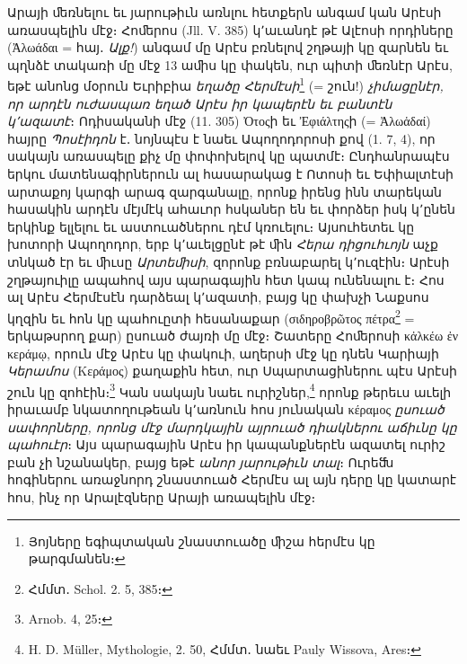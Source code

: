 \documentclass{article}
\begin{document}
{Արայի ﬔռնելու եւ յարութիւն առնլու հետքերն անգամ կան Արէսի առասպելին մէջ։ Հոﬔրոս (Jll. V. 385) կ՚աւանդէ թէ Ալէոսի որդիները (Ἀλωάδαι = հայ․ \emph{Ալք!}) անգամ մը Արէս բռնելով շղթայի կը զարնեն եւ պղնձէ տակառի մը մէջ 13 աﬕս կը փակեն, ուր պիտի ﬔռնէր Արէս, եթէ անոնց մօրուն Եւրիբիա \emph{եղածը Հերմէսի}\footnote{Յոյները եգիպտական շնաստուածը ﬕշա հերմէս կը թարգմանեն։} (= շուն!) \emph{չիմացընէր, որ արդէն ուժասպառ եղած Արէս իր կապերէն եւ բանտէն կ՚ազատէ}։ Ոդիսականի մէջ (11. 305) Ὀτοςի եւ Ἐφιάλτηςի (= Ἀλωἁδαί) հայրը \emph{Պոսէիդոն} է․ նոյնպէս է նաեւ Ապողոդորոսի քով (1. 7, 4), որ սակայն առասպելը քիչ մը փոփոխելով կը պատմէ։ Ընդհանրապէս երկու մատենագիրներուն ալ հասարակաց է Ոտոսի եւ Եփիալտէսի արտաքոյ կարգի արագ զարգանալը, որոնք իրենց ինն տարեկան հասակին արդէն մէյմէկ ահաւոր հսկաներ են եւ փորձեր իսկ կ՚ընեն երկինք ելլելու եւ աստուածներու դէմ կռուելու։ Այսուհետեւ կը խոտորի Ապողոդոր, երբ կ՚աւելցընէ թէ ﬕն \emph{Հերա դիցուհւոյն} աչք տնկած էր եւ ﬕւսը \emph{Արտեﬕսի}, զորոնք բռնաբարել կ՚ուզէին։ Արէսի շղթայուիլը ապահով այս պարագային հետ կապ ունենալու է։ Հոս ալ Արէս Հերմէսէն դարձեալ կ՚ազատի, բայց կը փախչի Նաքսոս կղզին եւ հոն կը պահուըտի հեսանաքար (σιδηροβρῶτος πέτρα\footnote{Հմմտ․ Schol. 2. 5, 385։} = երկաթսրող քար) ըսուած ժայռի մը մէջ։ Շատերը Հոﬔրոսի κἀλκέω ἐν κεράμῳ, որուն մէջ Արէս կը փակուի, աղերսի մէջ կը դնեն Կարիայի \emph{Կերամոս} (Κεράμος) քաղաքին հետ, ուր Սպարտացիներու պէս Արէսի շուն կը զոհէին։\footnote{Arnob. 4, 25։} Կան սակայն նաեւ ուրիշներ,\footnote{H. D. Müller, Mythologie, 2. 50, Հմմտ․ նաեւ Pauly Wissova, Ares։} որոնք թերեւս աւելի իրաւամբ նկատողութեան կ՚առնուն հոս յունական κέραμος \emph{ըսուած սափորները, որոնց մէջ մարդկային այրուած դիակներու աճիւնը կը պահուէր}։ Այս պարագային Արէս իր կապանքներէն ազատել ուրիշ բան չի նշանակեր, բայց եթէ \emph{անոր յարութիւն տալ}։ Ուրեﬓ հոգիներու առաջնորդ շնաստուած Հերմէս ալ այն դերը կը կատարէ հոս, ինչ որ Արալէզները Արայի առապելին մէջ։

}
\end{document}
